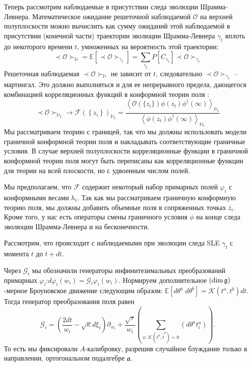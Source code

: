 \documentclass[14pt,autoref,href,facsimile
]{disser}
\begin{document}
Теперь рассмотрим наблюдаемые в присутствии следа эволюции Шрамма-Левнера. Математическое ожидание решеточной наблюдаемой $\mathcal{O}$ на верхней полуплоскости можно вычислить как сумму ожиданий этой наблюдаемой в присутствии (конечной части) траектории эволюции Шрамма-Левнера  $\gamma_{t}$ вплоть до некоторого времени $t$, умноженных на вероятность этой траектории:
\begin{equation*}
  \prec \mathcal{O} \succ_{\mathbb{H}}=\mathbb{E}\left[\prec\mathcal{O}\succ_{\gamma_{t}}\right]=\sum_{\gamma_{t}} P\left[C_{\gamma_{t}}\right] \prec \mathcal{O} \succ_{\gamma_{t}}
\end{equation*}
Решеточная наблюдаемая  $\prec \mathcal{O} \succ_{\mathbb{H}}$ не зависит от  $t$, следовательно $\prec\mathcal{O}\succ_{\gamma_{t}}$ -- мартингал. Это должно выполняться и для ее непрерывного предела, дающегося комбинацией корреляционных функций в конформной теории поля \cite{bauer2003sle}:
\begin{equation}
  \prec \mathcal{O} \succ_{\mathbb{H}_{t}}\to \mathcal{F}(\left\{z_{i}\right\})_{\mathbb{H}_{t}}=
  \frac{\left< \mathcal{O}(\{z_{i}\})\phi(z_{t})\phi^{\dagger}(\infty)\right>_{\mathbb{H}_{t}}}{\left<\phi(z_{t})\phi^{\dagger}(\infty)\right>_{\mathbb{H}_{t}}}
\label{eq:162}
\end{equation}
Мы рассматриваем теорию с границей, так что мы должны использовать модели граничной конформной теории поля и накладывать соответствующие граничные условия. В случае верхней полуплоскости корреляционные функции в граничной конформной теории поля могут быть переписаны как корреляционные функции для теории на всей плоскости, но с удвоенным числом полей.

Мы предполагаем, что $\mathcal{F}$ содержит некоторый набор примарных полей  $\varphi_{i}$ с конформными весами $h_{i}$. Так как мы рассматриваем граничную конформную теорию поля, мы должны добавить объемные поля в сопряженных точках  $\bar z_{i}$.  Кроме того, у нас есть операторы смены граничного условия   $\phi$ на конце следа эволюции Шрамма-Левнера и на бесконечности.

Рассмотрим, что происходит с наблюдаемыми при эволюции следа SLE $\gamma_{t}$ с момента   $t$ до $t+ dt$. 

Через  $\mathcal{G}_{i}$ мы обозначили  генераторы инфинитезимальных преобразований примарных $\varphi_{i}$:$d\varphi_{i}(w_{i}) = \mathcal{G}_{i}\varphi_{i}(w_{i})$. Нормируем дополнительное $\left(\dim\mathfrak{g}\right)$-мерное Броуновское движение следующим образом: $\mathbb  {E}\left[d\theta^{a}\; d\theta^{b}\right]=\mathcal{K}(t^{a},t^{b})dt$. Тогда генератор преобразования поля равен
\begin{equation}
  \mathcal{G}_{i}=\left(\frac{2dt}{w_{i}}-\sqrt{\kappa} d\xi_{t}\right) \partial_{w_{i}}+\frac{\sqrt{\tau}}{w_{i}}\left(\sum_{a:\mathcal{K}(t^{a},\tilde{t}^{b})=0}\left(d \theta ^{a} t^{a}_{i}\right)\right).
\label{eq:179}
\end{equation}
То есть мы фиксировали  $A$-калибровку, разрешив случайное блуждание только в направлении, ортогональном подалгебре $\mathfrak{a}$. 
\end{document}
